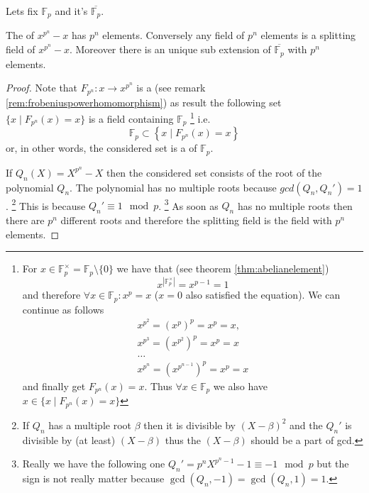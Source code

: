 \begin{theorem}
  Lets fix $\mathbb{F}_p$ and it's 
  $\overline{\mathbb{F}_p}$.

  The  of $x^{p^n} - x$ has $p^n$
  elements. Conversely any field of $p^n$ elements is a splitting
  field of $x^{p^n} - x$. Moreover there is an unique sub extension of
  $\overline{\mathbb{F}_p}$ with $p^n$ elements.
  \begin{proof}
    Note that $F_{p^n} : x \to x^{p^n}$ is a
     (see remark
    \ref{rem:frobeniuspowerhomomorphism}) as result the following set
    $\{
    x \mid F_{p^n}\left(x\right) = x
    \}$ is a field containing $\mathbb{F}_p$
    \footnote{
      For $x \in \mathbb{F}_p^{\times} = \mathbb{F}_p \setminus \{0\}$ we
      have that (see theorem \ref{thm:abelianelement})
      \[
      x^{\left|\mathbb{F}_p^{\times}\right|} = x^{p-1} = 1
      \]
      and therefore $\forall x \in \mathbb{F}_p: x^p = x$ ($x = 0$
      also satisfied the equation). We can continue as follows
      \begin{eqnarray}
        x^{p^2} = \left(x^p\right)^p = x^p = x,
        \nonumber \\
        x^{p^3} = \left(x^{p^2}\right)^p = x^p = x
        \nonumber \\
        \dots
        \nonumber \\
        x^{p^n} = \left(x^{p^{n-1}}\right)^p = x^p = x
        \nonumber
      \end{eqnarray}
      and finally get
      $F_{p^n}\left(x\right) = x$.
      Thus $\forall x \in \mathbb{F}_p$ we also have
      $x \in \{
      x \mid F_{p^n}\left(x\right) = x
      \}$
    }
    i.e.
    \[
    \mathbb{F}_p \subset
    \left\{
    x \mid F_{p^n}\left(x\right) = x
    \right\}
    \]
    or, in other words, the considered set is a  of
    $\mathbb{F}_p$.
    
    If $Q_n\left(X\right) = X^{p^n} - X$ then the considered set
    consists of the root of the polynomial $Q_n$. The polynomial has
    no multiple roots because $gcd(Q_n, Q_n') = 1$.
    \footnote{
      If $Q_n$ has a multiple root $\beta$ then it is divisible by
      $\left(X - \beta\right)^2$ and the $Q_n'$ is divisible by (at
      least) $\left(X - \beta\right)$ thus the $\left(X -
      \beta\right)$ should be a part of gcd.
    }
    This is because $Q_n' \equiv 1 \mod p$.
    \footnote{
      Really we have the following one $Q_n' = p^n X^{p^n - 1} - 1
      \equiv -1 \mod p$ but the sign is not really matter because
      $\gcd\left(Q_n, -1\right) = \gcd\left(Q_n, 1\right) = 1$. 
    }
    As soon as $Q_n$ has no multiple roots then there are $p^n$
    different roots and therefore the splitting field is the field
    with $p^n$ elements.


\end{proof}
\end{theorem}
